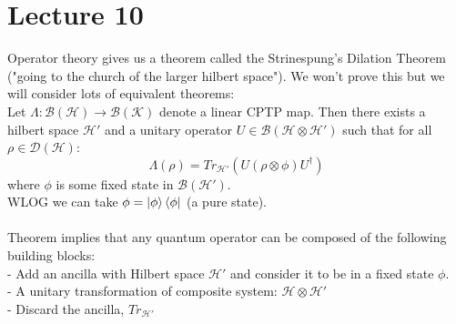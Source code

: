 \documentclass{article}
\begin{document}
\section{Lecture 10}
Operator theory gives us a theorem called the Strinespung's Dilation Theorem ("going to the church of the larger hilbert space"). We won't prove this but we will consider lots of equivalent theorems:\\
Let $\Lambda: \mathcal{B}(\mathcal{H}) \rightarrow \mathcal{B}(\mathcal{K})$ denote a linear CPTP map. Then there exists a hilbert space $\mathcal{H'}$  and a unitary operator $U \in \mathcal{B}(\mathcal{H}\otimes \mathcal{H}')$ such that for all $\rho \in \mathcal{D}(\mathcal{H})$:
$$
\Lambda (\rho) = Tr_{\mathcal{H}'}(U(\rho \otimes \phi) U^{\dagger})
$$
 where $\phi$ is some fixed state in $\mathcal{B}(\mathcal{H}')$.\\
 WLOG we can take $\phi = \ket{\phi}\bra{\phi}$ (a pure state).\\\\
 Theorem implies that any quantum operator can be composed of the following building blocks:\\
 - Add an ancilla with Hilbert space $\mathcal{H}'$ and consider it to be in a fixed state $\phi$.\\
- A unitary transformation of composite system: $\mathcal{H} \otimes \mathcal{H}'$\\
- Discard the ancilla, $Tr_{\mathcal{H}'}$
\end{document}
